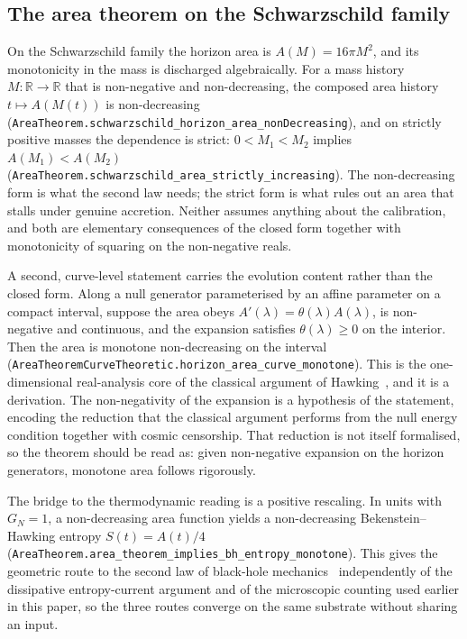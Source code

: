 \documentclass[aps,prd,nofootinbib,superscriptaddress,12pt]{revtex4-2}
\DeclareRobustCommand{\lb}{\discretionary{}{}{}}
\begin{document}
\subsection{The area theorem on the Schwarzschild family}
\label{sec:bh-theorems-area}

On the Schwarzschild family the horizon area is $A(M) = 16\pi M^2$, and its
monotonicity in the mass is discharged algebraically. For a mass history
$M : \mathbb{R} \to \mathbb{R}$ that is non-negative and non-decreasing, the
composed area history $t \mapsto A(M(t))$ is non-decreasing
(\texttt{Area\lb{}Theorem.\lb{}schwarzschild\_\lb{}horizon\_\lb{}area\_\lb{}non\lb{}Decreasing}), and on
strictly positive masses the dependence is strict: $0 < M_1 < M_2$ implies
$A(M_1) < A(M_2)$ (\texttt{Area\lb{}Theorem.\lb{}schwarzschild\_\lb{}area\_\lb{}strictly\_\lb{}increasing}).
The non-decreasing form is what the second law needs; the strict form is what
rules out an area that stalls under genuine accretion. Neither assumes anything
about the calibration, and both are elementary consequences of the closed form
together with monotonicity of squaring on the non-negative reals.

A second, curve-level statement carries the evolution content rather than the
closed form. Along a null generator parameterised by an affine parameter on a
compact interval, suppose the area obeys $A'(\lambda) = \theta(\lambda)
A(\lambda)$, is non-negative and continuous, and the expansion satisfies
$\theta(\lambda) \ge 0$ on the interior. Then the area is monotone
non-decreasing on the interval
(\texttt{Area\lb{}Theorem\lb{}Curve\lb{}Theoretic.\lb{}horizon\_\lb{}area\_\lb{}curve\_\lb{}monotone}). This is the
one-dimensional real-analysis core of the classical argument of
Hawking~\cite{Hawking1971}, and it is a derivation. The non-negativity of the
expansion is a hypothesis of the statement, encoding the reduction that the
classical argument performs from the null energy condition together with cosmic
censorship. That reduction is not itself formalised, so the theorem should be
read as: given non-negative expansion on the horizon generators, monotone area
follows rigorously.

The bridge to the thermodynamic reading is a positive rescaling. In units with
$G_N = 1$, a non-decreasing area function yields a non-decreasing
Bekenstein--Hawking entropy $S(t) = A(t)/4$
(\texttt{Area\lb{}Theorem.\lb{}area\_\lb{}theorem\_\lb{}implies\_\lb{}bh\_\lb{}entropy\_\lb{}monotone}). This gives
the geometric route to the second law of black-hole
mechanics~\cite{BardeenCarterHawking1973} independently of the dissipative
entropy-current argument and of the microscopic counting used earlier in this
paper, so the three routes converge on the same substrate without sharing an
input.
\end{document}
